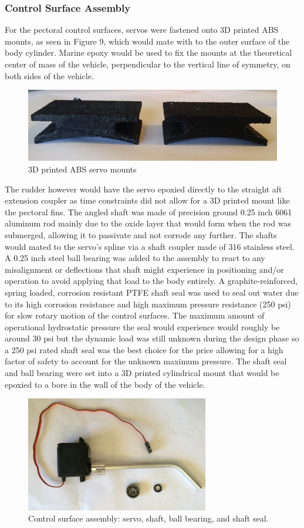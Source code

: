 \documentclass{report}
\begin{document}
\subsubsection{Control Surface Assembly}
For the pectoral control surfaces, servos were fastened onto 3D printed ABS mounts, as seen in Figure 9, which would mate with to the outer surface of the body cylinder. Marine epoxy would be used to fix the mounts at the theoretical center of mass of the vehicle, perpendicular to the vertical line of symmetry, on both sides of the vehicle.
\begin{figure}[H]
\centering
\includegraphics[width=12cm]{servomounts}
\caption{3D printed ABS servo mounts}
\end{figure}
The rudder however would have the servo epoxied directly to the straight aft extension coupler as time constraints did not allow for a 3D printed mount like the pectoral fins. The angled shaft was made of precision ground 0.25 inch 6061 aluminum rod mainly due to the oxide layer that would form when the rod was submerged, allowing it to passivate and not corrode any further. The shafts would mated to the servo’s spline via a shaft coupler made of 316 stainless steel. A 0.25 inch steel ball bearing was added to the assembly to react to any misalignment or deflections that shaft might experience in positioning and/or operation to avoid applying that load to the body entirely. A graphite-reinforced, spring loaded, corrosion resistant PTFE shaft seal was used to seal out water due to its high corrosion resistance and high maximum pressure resistance (250 psi) for slow rotary motion of the control surfaces. The maximum amount of operational hydrostatic pressure the seal would experience would roughly be around 30 psi but the dynamic load was still unknown during the design phase so a 250 psi rated shaft seal was the best choice for the price allowing for a high factor of safety to account for the unknown maximum pressure. The shaft seal and ball bearing were set into a 3D printed cylindrical mount that would be epoxied to a bore in the wall of the body of the vehicle. 
\begin{figure}[H]
\centering
\includegraphics[width=8cm]{servoshaft}
\caption{Control surface assembly: servo, shaft, ball bearing, and shaft seal.}
\end{figure}
\end{document}
